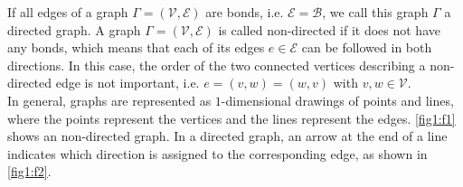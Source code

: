 If all edges of a graph $\Gamma = (\mathcal{V}, \mathcal{E})$ are bonds, i.e. $\mathcal{E} = \mathcal{B}$, we call this graph $\Gamma$ a directed graph. A graph $\Gamma = (\mathcal{V}, \mathcal{E})$ is called non-directed if it does not have any bonds, which means that each of its edges $e \in \mathcal{E}$ can be followed in both directions. In this case, the order of the two connected vertices describing a non-directed edge is not important, i.e. $e = (v, w) = (w, v)$ with $v, w \in \mathcal{V}$. \\
In general, graphs are represented as $1$-dimensional drawings of points and lines, where the points represent the vertices and the lines represent the edges. \cref{fig1:f1} shows an non-directed graph. In a directed graph, an arrow at the end of a line indicates which direction is assigned to the corresponding edge, as shown in \cref{fig1:f2}. 

